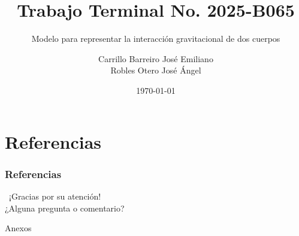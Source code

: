 \documentclass[spanish]{beamer}
\author[Carrillo B. José E. \&  Robles O. José A.]{Carrillo Barreiro José Emiliano \\ Robles Otero José Ángel}
\title{Trabajo Terminal No. 2025-B065}
\subtitle{Modelo para representar la interacción gravitacional de dos cuerpos}
\institute{Instituto Politécnico Nacional \\ Escuela Superior de Cómputo}
\date{\today}
\begin{document}
    \begin{frame}
        \titlepage%
    \end{frame}

    
    

    

    \section{Referencias}

    \begin{frame}[allowframebreaks]
        \frametitle{Referencias}
        \begingroup
        \fontsize{6pt}{7pt}\selectfont
        \printbibliography[heading=none]
        \endgroup
    \end{frame}

    \begin{frame}
        \begin{center}
            {\Huge\calligra~¡Gracias por su atención!}\\
            ¿Alguna pregunta o comentario?
        \end{center}
    \end{frame}

    \appendix
    \makeatletter
    \renewcommand{\thesection}{\Alph{section}}
    \makeatother
    \setcounter{section}{0}

    \begin{frame}
        \begingroup
        \begin{center}
            {\Huge Anexos}
        \end{center}
        \endgroup
    \end{frame}
    
    
    
    
    
    
\end{document}
